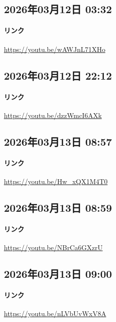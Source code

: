 \subsection*{2026年03月12日 03:32}

\paragraph{リンク}
\url{https://youtu.be/wAWJnL71XHo}

\subsection*{2026年03月12日 22:12}

\paragraph{リンク}
\url{https://youtu.be/dzzWmcI6AXk}

\subsection*{2026年03月13日 08:57}

\paragraph{リンク}
\url{https://youtu.be/Hw_xQX1M4T0}

\subsection*{2026年03月13日 08:59}

\paragraph{リンク}
\url{https://youtu.be/NBrCa6GXzrU}

\subsection*{2026年03月13日 09:00}

\paragraph{リンク}
\url{https://youtu.be/nLVbUvWxV8A}

